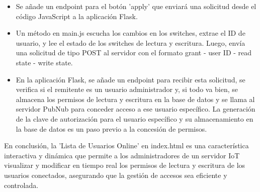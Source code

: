 \documentclass{report}
\begin{document}
\begin{itemize}
\begin{itemize}
        \item Se añade un endpoint para el botón 'apply' que enviará una solicitud desde el código JavaScript a la aplicación Flask.
        \item Un método en main.js escucha los cambios en los switches, extrae el ID de usuario, y lee el estado de los switches de lectura y 
        escritura. Luego, envía una solicitud de tipo POST al servidor con el formato grant - user ID - read state - write state.
        \item En la aplicación Flask, se añade un endpoint para recibir esta solicitud, se verifica si el remitente es un usuario administrador y, 
        si todo va bien, se almacena los permisos de lectura y escritura en la base de datos y se llama al servidor PubNub para conceder 
        acceso a ese usuario específico. La generación de la clave de autorización para el usuario específico y su almacenamiento en la 
        base de datos es un paso previo a la concesión de permisos.
    \end{itemize}
\end{itemize}
En conclusión, la 'Lista de Usuarios Online' en index.html es una característica interactiva y dinámica que permite a los administradores 
de un servidor IoT visualizar y modificar en tiempo real los permisos de lectura y escritura de los usuarios conectados, asegurando que 
la gestión de accesos sea eficiente y controlada.
\end{document}
